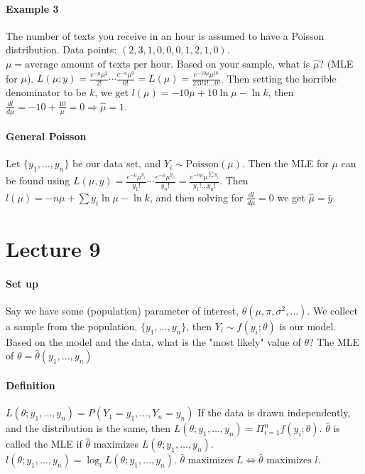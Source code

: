 \documentclass[10pt,letter]{article}
\theoremstyle{plain}
\theoremstyle{definition}
\begin{document}
\paragraph{Example 3}
The number of texts you receive in an hour is assumed to have a Poisson distribution. Data points: $(2,3,1,0,0,0,1,2,1,0)$. $\mu=\text{average amount of texts per hour}$. Based on your sample, what is $\hat{\mu}$? (MLE for $\mu$). $L(\mu;y)=\frac{e^{-\mu}\mu^2}{2!}\cdots\frac{e^{-u}\mu^0}{0!}=L(\mu)=\frac{e^{-10\mu}\mu^{10}}{2!3!1!\ldots0!}$. Then setting the horrible denominator to be $k$, we get $l(\mu)=-10\mu+10\ln\mu-\ln k$, then $\frac{dl}{d\mu}=-10+\frac{10}{\mu}=0\Rightarrow \hat{\mu}=1$. 
\paragraph{General Poisson}
Let $\{y_1,\ldots,y_n\}$ be our data set, and $Y_i\sim \text{Poisson}(\mu)$. Then the MLE for $\mu$ can be found using $L(\mu,y)=\frac{e^{-\mu}\mu^{y_1}}{y_1!}\cdots\frac{e^{-\mu}\mu^{y_n}}{y_n!}=\frac{e^{-n\mu}\mu^{\sum y_i}}{y_1!\ldots y_n!}$. Then $l(\mu)=-n\mu+\sum y_i\ln\mu-\ln k$, and then solving for $\frac{dl}{d\mu}=0$ we get $\hat{\mu}=\bar{y}$. 

\section*{Lecture 9}
\paragraph{Set up}
Say we have some (population) parameter of interest, $\theta(\mu,\pi,\sigma^2,\ldots)$. We collect a sample from the population, $\{y_1,\ldots,y_n\}$, then $Y_i\sim f(y_i;\theta)$ is our model. Based on the model and the data, what is the "most likely" value of $\theta$? The MLE of $\theta=\hat{\theta}(y_1,\ldots,y_n)$\\ 
\paragraph{Definition}
$L(\theta;y_1,\ldots,y_n)=P(Y_1=y_1,\ldots,Y_n=y_n)$ If the data is drawn independently, and the distribution is the same, then $L(\theta;y_1,\ldots,y_n)=\Pi_{i=1}^nf(y_i;\theta)$. $\hat{\theta}$ is called the MLE if $\hat{\theta}$ maximizes $L(\theta;y_1,\ldots,y_n)$. $l(\theta;y_1,\ldots,y_n)=\log_lL(\theta;y_1,\ldots,y_n)$. $\hat{\theta}\text{ maximizes }L\Leftrightarrow \hat{\theta}\text{ maximizes }l$. 
\end{document}
